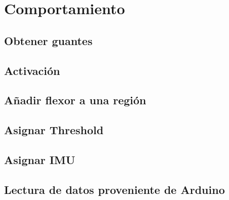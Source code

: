 \section{Comportamiento}

\subsection{Obtener guantes}
\subsection{Activación}

\subsection{Añadir flexor a una región}
\subsection{Asignar Threshold}
\subsection{Asignar IMU}
\subsection{Lectura de datos proveniente de Arduino}